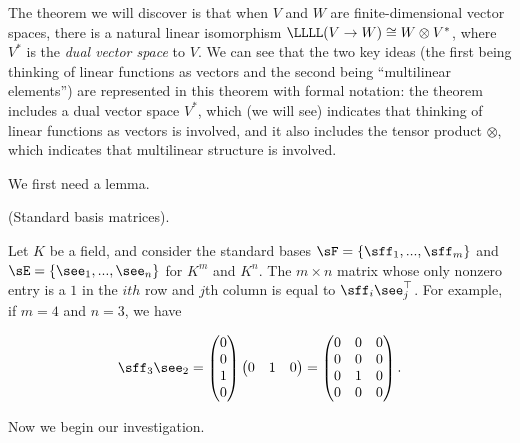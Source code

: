 The theorem we will discover is that when $V$ and $W$ are finite-dimensional vector spaces, there is a natural linear isomorphism $\LLLL(V \rightarrow W) \cong W \otimes V^*$, where $V^*$ is the \textit{dual vector space} to $V$. We can see that the two key ideas (the first being thinking of linear functions as vectors and the second being ``multilinear elements'') are represented in this theorem with formal notation: the theorem includes a dual vector space $V^*$, which (we will see) indicates that thinking of linear functions as vectors is involved, and it also includes the tensor product $\otimes$, which indicates that multilinear structure is involved.

We first need a lemma.

\begin{lemma}
    (Standard basis matrices).

    Let $K$ be a field, and consider the standard bases $\sF = \{ \sff_1, ..., \sff_m\}$ and $\sE = \{\see_1, ..., \see_n\}$ for $K^m$ and $K^n$. The $m \times n$ matrix whose only nonzero entry is a $1$ in the $ith$ row and $j$th column is equal to $\sff_i \see_j^\top$. For example, if $m = 4$ and $n = 3$, we have

    \begin{align*}
        \sff_3 \see_2 = 
        \begin{pmatrix}
            0 \\
            0 \\
            1 \\
            0
        \end{pmatrix}
        \begin{pmatrix}
            0 & 1 & 0
        \end{pmatrix}
        =
        \begin{pmatrix}
            0 & 0 & 0 \\
            0 & 0 & 0 \\
            0 & 1 & 0 \\
            0 & 0 & 0
        \end{pmatrix}.
    \end{align*}
\end{lemma}

Now we begin our investigation.

